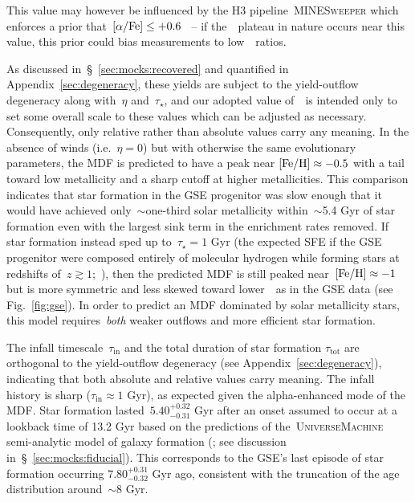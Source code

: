 \documentclass[ms.tex]{subfiles}
\begin{document}
This value may however be influenced by the H3 pipeline~\textsc{MINESweeper}
which enforces a prior that~$\text{[$\alpha$/Fe]} \leq +0.6$~\citep{Cargile2020} -- if
the~\afe~plateau in nature occurs near this value, this prior could bias
measurements to low~\afe~ratios.
\par
As discussed in~\S~\ref{sec:mocks:recovered} and quantified in
Appendix~\ref{sec:degeneracy}, these yields are subject to the yield-outflow
degeneracy along with~$\eta$ and~$\tau_\star$, and our adopted value
of~\yacc~is intended only to set some overall scale to these values which can
be adjusted as necessary.
Consequently, only relative rather than absolute values carry any meaning.
In the absence of winds (i.e.~$\eta = 0$) but with otherwise the same
evolutionary parameters, the MDF is predicted to have a peak near
$\text{[Fe/H]} \approx -0.5$ with a tail toward low metallicity and a sharp cutoff at
higher metallicities.
This comparison indicates that star formation in the GSE progenitor was slow
enough that it would have achieved only~$\sim$one-third solar metallicity
within~$\sim$5.4 Gyr of star formation even with the largest sink term in the
enrichment rates removed.
If star formation instead sped up to~$\tau_\star = 1$ Gyr (the expected SFE if
the GSE progenitor were composed entirely of molecular hydrogen while forming
stars at redshifts of~$z \gtrsim 1$;~\citealp{Tacconi2018}), then the
predicted MDF is still peaked near~$\text{[Fe/H]} \approx -1$ but is more symmetric and
less skewed toward lower~\feh~as in the GSE data (see Fig.~\ref{fig:gse}).
In order to predict an MDF dominated by solar metallicity stars, this model
requires~\textit{both} weaker outflows and more efficient star formation.
\par
The infall timescale~$\tau_\text{in}$ and the total duration of star formation
$\tau_\text{tot}$ are orthogonal to the yield-outflow degeneracy (see
Appendix~\ref{sec:degeneracy}), indicating that both absolute and relative
values carry meaning.
The infall history is sharp ($\tau_\text{in} \approx 1$ Gyr), as expected given
the alpha-enhanced mode of the MDF.
Star formation lasted~$5.40^{+0.32}_{-0.31}$ Gyr after an onset assumed to
occur at a lookback time of 13.2 Gyr based on the predictions of
the~\textsc{UniverseMachine} semi-analytic model of galaxy formation
(\citealp{Behroozi2019}; see discussion in~\S~\ref{sec:mocks:fiducial}).
This corresponds to the GSE's last episode of star formation occurring
$7.80^{+0.31}_{-0.32}$ Gyr ago, consistent with the truncation of the age
distribution around~$\sim$8 Gyr.
\end{document}
